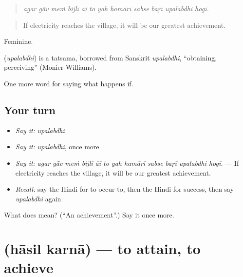 \begin{quote}
\emph{agar gā̃v meṁ bijlī āī to yah hamārī sabse baṛī upalabdhi hogī.}
\end{quote}

\begin{quote}
If electricity reaches the village, it will be our greatest achievement.
\end{quote}

Feminine.

\begin{cousinweb}
\textbf{} (\emph{upalabdhi}) is a tatsama, borrowed from Sanskrit \emph{upalabdhi}, \textquotedblleft{}obtaining, perceiving\textquotedblright{} (Monier-Williams).
\end{cousinweb}

\begin{grammarlens}[title={What you've built}]
One more word for saying what happens if.
\end{grammarlens}

\subsection*{Your turn}
\begin{itemize}
\raggedright
  \item \emph{Say it:} \emph{upalabdhi}
  \item \emph{Say it:} \emph{upalabdhi}, once more
  \item \emph{Say it:} \emph{agar gā̃v meṁ bijlī āī to yah hamārī sabse baṛī upalabdhi hogī.} — If electricity reaches the village, it will be our greatest achievement.
  \item \emph{Recall:} say the Hindi for to occur to, then the Hindi for success, then say \emph{upalabdhi} again
\end{itemize}

\begin{tcolorbox}[breakable,colback=teal!4,colframe=teal!35!black,title={Before you move on}]
What does  mean? (\textquotedblleft{}An achievement\textquotedblright{}.) Say it once more.
\end{tcolorbox}
\section[\texorpdfstring{\hi{हासिल} \hi{करना} (hāsil karnā)}{हासिल करना (hāsil karnā)}]{  (hāsil karnā) — to attain, to achieve}

\label{lesson:HI-C393-hasilkarna}



